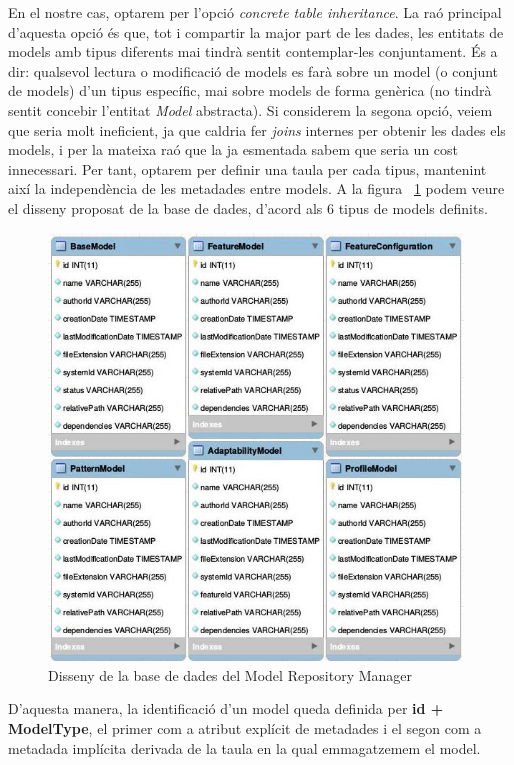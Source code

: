 En el nostre cas, optarem per l'opció \textit{concrete table inheritance}. La raó principal d'aquesta opció és que, tot i compartir la major part de les dades, les entitats de models amb tipus diferents mai tindrà sentit contemplar-les conjuntament. És a dir: qualsevol lectura o modificació de models es farà sobre un model (o conjunt de models) d'un tipus específic, mai sobre models de forma genèrica (no tindrà sentit concebir l'entitat \textit{Model} abstracta). Si considerem la segona opció, veiem que seria molt ineficient, ja que caldria fer \textit{joins} internes per obtenir les dades els models, i per la mateixa raó que la ja esmentada sabem que seria un cost innecessari. Per tant, optarem per definir una taula per cada tipus, mantenint així la independència de les metadades entre models. A la figura ~\ref{fig:Figura20} podem veure el disseny proposat de la base de dades, d'acord als 6 tipus de models definits.\\

\begin{figure}
\centering
\includegraphics[width=11cm]{Figures/Figure20}
\decoRule
\caption{Disseny de la base de dades del Model Repository Manager}
\label{fig:Figura20}
\end{figure}

D'aquesta manera, la identificació d'un model queda definida per \textbf{id + ModelType}, el primer com a atribut explícit de metadades i el segon com a metadada implícita derivada de la taula en la qual emmagatzemem el model.

